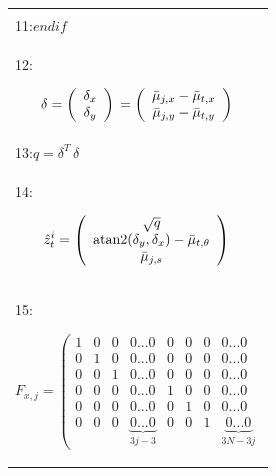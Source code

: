 \documentclass[10pt,a4paper]{article}
\begin{document}
\begin{table}[H]
\begin{center}
\begin{tabular}{|l|}
\begin{minipage}{0.2\textwidth}
\begin{equation*}
\end{equation*}
\end{minipage}\\
11:\hspace{9mm}$\textit{endif}$\\
12:\hspace{9mm}
\begin{minipage}{0.2\textwidth}
\begin{equation*}
\delta=\left(\begin{array}{c} \delta_x\\
\delta_y\\
\end{array} \right)\\
=\left(\begin{array}{c} \bar{\mu}_{j,x}-\bar{\mu}_{t,x}\\
\bar{\mu}_{j,y}-\bar{\mu}_{t,y}\\
\end{array} \right)\\
\end{equation*}
\end{minipage}\\
13:\hspace{9mm}$q=\delta^T\,\delta$\\
14:\hspace{9mm}
\begin{minipage}{0.2\textwidth}
\begin{equation*}
\hat{z}_t^i=\left(\begin{array}{c} \sqrt{q}\\
\text{atan2}(\delta_y,\delta_x)-\bar{\mu}_{t,\theta}\\
\bar{\mu}_{j,s}
\end{array} \right)\\
\end{equation*}
\end{minipage}\\
15:\hspace{9mm}
\begin{minipage}{0.2\textwidth}
\begin{equation*}
F_{x,j}=\left(\begin{array}{cccccccc} 
1&0&0&0...0&0&0&0&0...0\\
0&1&0&0...0&0&0&0&0...0\\
0&0&1&0...0&0&0&0&0...0\\
0&0&0&0...0&1&0&0&0...0\\
0&0&0&0...0&0&1&0&0...0\\
0&0&0&\underbrace{0...0}_{3j-3}&0&0&1&\underbrace{0...0}_{3N-3j}

\end{array}
\end{equation*}
\end{minipage}
\end{tabular}
\end{center}
\end{table}
\end{document}
